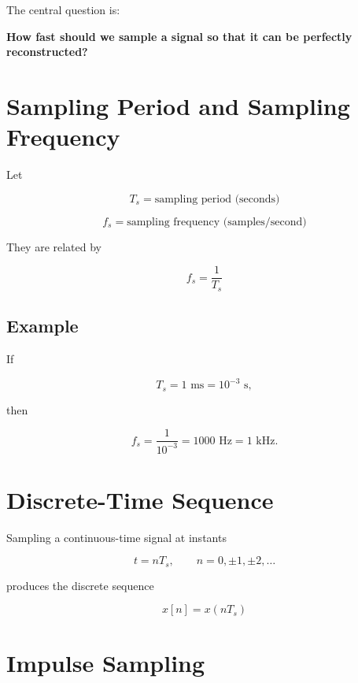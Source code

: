 The central question is:

\begin{center}
\textbf{How fast should we sample a signal so that it can be perfectly reconstructed?}
\end{center}


\section{Sampling Period and Sampling Frequency}

Let

\[
T_s=\text{sampling period (seconds)}
\]

\[
f_s=\text{sampling frequency (samples/second)}
\]

They are related by

\[
\boxed{
f_s=\frac{1}{T_s}
}
\]


\subsection{Example}

If

\[
T_s=1\text{ ms}=10^{-3}\text{ s},
\]

then

\[
f_s=\frac{1}{10^{-3}}=1000\text{ Hz}=1\text{ kHz}.
\]


\section{Discrete-Time Sequence}

Sampling a continuous-time signal at instants

\[
t=nT_s,\qquad n=0,\pm1,\pm2,\ldots
\]

produces the discrete sequence

\[
\boxed{
x[n]=x(nT_s)
}
\]


\section{Impulse Sampling}

